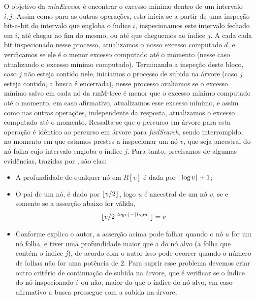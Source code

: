     
    O objetivo da \textit{minExcess}, é encontrar o excesso mínimo dentro de um intervalo $i, j$. Assim como para as outras operações, esta inicia-se a partir de uma inspeção bit-a-bit do intervalo que
    engloba o índice $i$, inspecionamos este intervalo fechado em $i$, até chegar ao fim do mesmo, ou até que cheguemos ao índice $j$.
    A cada cada bit inspecionado nesse processo, atualizamos o nosso excesso computado $d$, e verificamos se ele é o menor excesso computado até o momento (nesse caso atualizando o excesso mínimo computado).
    Terminando a inspeção deste bloco, caso $j$ não esteja contido nele, iniciamos o processo de subida na árvore (caso $j$ esteja contido, a busca é encerrada),
    nesse processo avaliamos se o excesso mínimo salvo em cada nó da rmM-tree é menor que o excesso mínimo computado até o momento,
    em caso afirmativo, atualizamos esse excesso mínimo, e  assim como nas outras operações, independente da resposta,
    atualizamos o excesso computado até o momento.
    Ressalta-se que o percurso em árvore para esta operação é idêntico ao percurso em árvore para \textit{fwdSearch},
    sendo interrompido, no momento em que estamos prestes a inspecionar um nó $v$, que seja ancestral do nó folha cujo intervalo engloba o índice $j$.
    Para tanto, precisamos de algumas evidências, trazidas por \citeauthor{book-compact-data-structures}, são elas:
    \begin{itemize}
        \item A profundidade de qualquer nó em $R[v]$ é dada por $\lfloor\log v\rfloor +1$;
        \item O pai de um nó, é dado por $\lfloor v/2\rfloor$, logo $u$ é ancestral de um nó $v$, se e somente se a asserção abaixo for válida,
        $$\lfloor v/2^{\lfloor log v\rfloor - \lfloor log u\rfloor}\rfloor = v$$
        \item Conforme explica o autor, a asserção acima pode falhar quando o nó $u$ for um nó folha,
         e tiver uma profundidade maior que a do nó alvo
        (a folha que contém o índice $j$), de acordo com o autor isso pode ocorrer quando o número de folhas não for uma potência de $2$. 
        Para suprir esse problema devemos criar outro critério de continuação de subida na árvore, que é verificar se o índice do nó
        inspecionado é ou não, maior do que o índice do nó alvo, em caso afirmativo a busca prossegue com a subida na árvore.
    \end{itemize}


